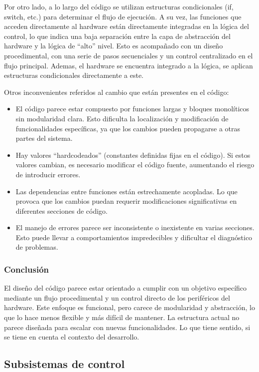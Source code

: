 Por otro lado, a lo largo del código se utilizan estructuras condicionales (if, switch, etc.) para determinar el flujo de ejecución. A su vez, las funciones que acceden directamente al hardware están directamente integradas en la lógica del control, lo que indica una baja separación entre la capa de abstracción del hardware y la lógica de ``alto'' nivel. Esto es acompañado con un diseño procedimental, con una serie de pasos secuenciales y un control centralizado en el flujo principal. Ademas, el hardware se encuentra integrado a la lógica, se aplican estructuras condicionales directamente a este.

Otros inconvenientes referidos al cambio que están presentes en el código:
\begin{itemize}
\item El código parece estar compuesto por funciones largas y bloques monolíticos sin modularidad clara. Esto dificulta la localización y modificación de funcionalidades específicas, ya que los cambios pueden propagarse a otras partes del sistema.
\item Hay valores ``hardcodeados'' (constantes definidas fijas en el código). Si estos valores cambian, es necesario modificar el código fuente, aumentando el riesgo de introducir errores.
\item Las dependencias entre funciones están estrechamente acopladas. Lo que provoca que los cambios puedan requerir modificaciones significativas en diferentes secciones de código.
\item El manejo de errores parece ser inconsistente o inexistente en varias secciones. Esto puede llevar a comportamientos impredecibles y dificultar el diagnóstico de problemas.
\end{itemize}

\subsubsection*{Conclusión}

El diseño del código parece estar orientado a cumplir con un objetivo específico mediante un flujo procedimental y un control directo de los periféricos del hardware. Este enfoque es funcional, pero carece de modularidad y abstracción, lo que lo hace menos flexible y más difícil de mantener. La estructura actual no parece diseñada para escalar con nuevas funcionalidades. Lo que tiene sentido, si se tiene en cuenta el contexto del desarrollo.


\subsection{Subsistemas de control}

